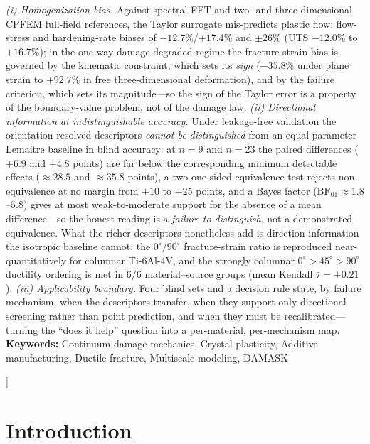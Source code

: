 \documentclass[12pt,a4paper,twocolumn]{article}
\begin{document}
\begin{@twocolumnfalse}
\begin{center}
\begin{minipage}{0.92\textwidth}
\emph{(i) Homogenization bias.} Against spectral-FFT and two- and three-dimensional CPFEM full-field references, the Taylor surrogate mis-predicts plastic flow: flow-stress and hardening-rate biases of $-12.7\%$/$+17.4\%$ and $\pm26\%$ (UTS $-12.0\%$ to $+16.7\%$); in the one-way damage-degraded regime the fracture-strain bias is governed by the kinematic constraint, which sets its \emph{sign} ($-35.8\%$ under plane strain to $+92.7\%$ in free three-dimensional deformation), and by the failure criterion, which sets its magnitude---so the sign of the Taylor error is a property of the boundary-value problem, not of the damage law. \emph{(ii) Directional information at indistinguishable accuracy.} Under leakage-free validation the orientation-resolved descriptors \emph{cannot be distinguished} from an equal-parameter Lemaitre baseline in blind accuracy: at $n=9$ and $n=23$ the paired differences ($+6.9$ and $+4.8$ points) are far below the corresponding minimum detectable effects ($\approx28.5$ and $\approx35.8$ points), a two-one-sided equivalence test rejects non-equivalence at no margin from $\pm10$ to $\pm25$ points, and a Bayes factor ($\mathrm{BF}_{01}\approx1.8$--$5.8$) gives at most weak-to-moderate support for the absence of a mean difference---so the honest reading is a \emph{failure to distinguish}, not a demonstrated equivalence. What the richer descriptors nonetheless add is direction information the isotropic baseline cannot: the $0^\circ/90^\circ$ fracture-strain ratio is reproduced near-quantitatively for columnar Ti-6Al-4V, and the strongly columnar $0^\circ\!>\!45^\circ\!>\!90^\circ$ ductility ordering is met in $6/6$ material--source groups (mean Kendall $\bar\tau=+0.21$). \emph{(iii) Applicability boundary.} Four blind sets and a decision rule state, by failure mechanism, when the descriptors transfer, when they support only directional screening rather than point prediction, and when they must be recalibrated---turning the ``does it help'' question into a per-material, per-mechanism map.
\vspace{2mm}
\noindent\textbf{Keywords:} Continuum damage mechanics, Crystal plasticity, Additive manufacturing, Ductile fracture, Multiscale modeling, DAMASK
\end{minipage}
\end{center}
\end{@twocolumnfalse}
]

\section{Introduction}
\end{document}
